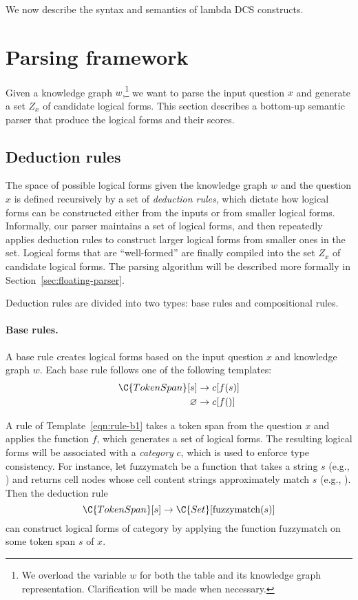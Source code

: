 We now describe the syntax and semantics of lambda DCS constructs.


\section{Parsing framework}

Given a knowledge graph $w$,\footnote{
We overload the variable $w$ for both the table and
its knowledge graph representation.
Clarification will be made when necessary.}
we want to parse the input question $x$
and generate a set $Z_x$ of candidate logical forms.
This section describes a bottom-up semantic parser
that produce the logical forms and their scores.

\subsection{Deduction rules}
The space of possible logical forms given the knowledge graph $w$
and the question $x$ is defined recursively
by a set of \emph{deduction rules},
which dictate how logical forms
can be constructed either from the inputs
or from smaller logical forms.
Informally,
our parser
maintains a set of logical forms,
and then repeatedly applies deduction rules
to construct larger logical forms
from smaller ones in the set.
Logical forms that are ``well-formed''
are finally compiled into
the set $Z_x$ of candidate logical forms.
The parsing algorithm will be described more formally
in Section~\ref{sec:floating-parser}.

Deduction rules are divided into two types: base rules
and compositional rules.

\paragraph{Base rules.}
A base rule creates logical forms based on the input
question $x$ and knowledge graph $w$.
Each base rule follows one of the following templates:
\begin{align}
\C{TokenSpan}[s] &\to c[f(s)] \label{eqn:rule-b1} \\
\varnothing &\to c[f()] \label{eqn:rule-b2}
\end{align}

A rule of Template~\ref{eqn:rule-b1} takes
a token span from the question $x$
and applies the function $f$,
which generates a set of logical forms.
The resulting logical forms will be associated with
a \emph{category} $c$, which is used to enforce type consistency.
For instance, let $\mathrm{fuzzymatch}$ be a function
that takes a string $s$ (e.g., )
and returns cell nodes whose cell content strings
approximately match $s$ (e.g., ).
Then the deduction rule
\begin{equation}
\C{TokenSpan}[s] \to \C{Set}[\mathrm{fuzzymatch}(s)]
\end{equation}
can construct logical forms of category 
by applying the function $\mathrm{fuzzymatch}$
on some token span $s$ of $x$.

